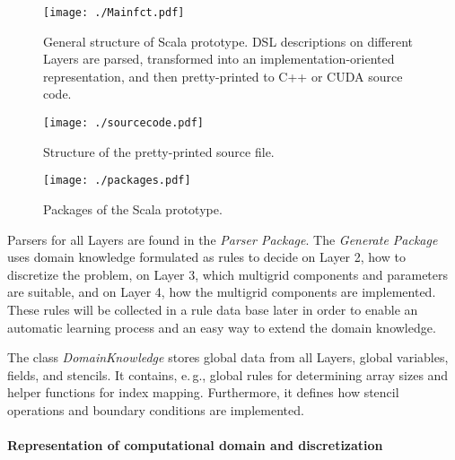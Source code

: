 \documentclass[onecolumn]{svjour3}
\begin{document}
\begin{figure}[ht!]
\begin{center}
\texttt{[image: ./Mainfct.pdf]}
\caption[Partitioning of a cell-centered grid into four sub-grids]{General structure of Scala prototype. DSL descriptions on different Layers are parsed, transformed into
an implementation-oriented representation, and then pretty-printed to C++ or CUDA source code.}
\label{fig:scalastructure}
\end{center}
\end{figure}

\begin{figure}[ht!]
\begin{center}
\texttt{[image: ./sourcecode.pdf]}
\caption[Partitioning of a cell-centered grid into four sub-grids]{Structure of the pretty-printed source file.}
\label{pix:scalasource}
\end{center}
\end{figure}

\begin{figure}[ht!]
\begin{center}
\texttt{[image: ./packages.pdf]}
\caption[Partitioning of a cell-centered grid into four sub-grids]{Packages of the Scala prototype.}
\label{fig:scalapackages}
\end{center}
\end{figure}


Parsers for all Layers are found in the \textit{Parser Package}.
The \textit{Generate Package} uses domain knowledge formulated as rules to decide on Layer 2, how to discretize the problem, on Layer 3, which multigrid components and parameters are suitable, and on Layer 4, how the multigrid components are implemented. These rules will be collected in a rule data base later in order to enable an automatic learning process and an easy way to extend the domain knowledge.








The class \textit{DomainKnowledge} stores global data from all Layers, global variables, fields, and stencils. It contains, e.\,g., global rules for determining array sizes and helper functions for index mapping. Furthermore, it defines how stencil operations and boundary conditions are implemented. 

\paragraph{Representation of computational domain and discretization}
\end{document}
